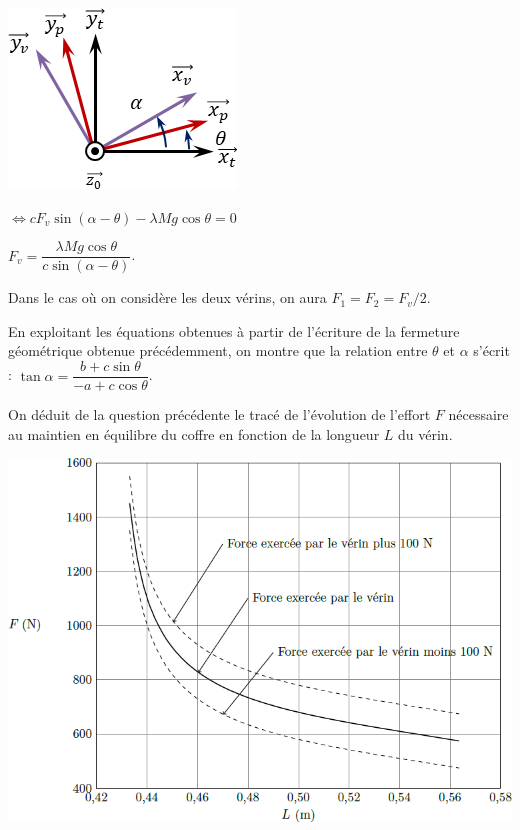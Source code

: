 \documentclass[10pt,fleqn]{article} %
\begin{document}
\begin{multicols}{2}
\begin{multicols}{2}
\begin{corrige}
\begin{center}
\includegraphics[width=.5\linewidth]{images/cor_03}

$\Leftrightarrow  c F_v\sin \left( \alpha - \theta\right) - \lambda Mg\cos \theta  = {0} $

$   F_v = \dfrac{\lambda Mg\cos \theta}{c\sin \left( \alpha - \theta\right)} $.

Dans le cas où on considère les deux vérins, on aura $F_1=F_2=F_v/2$.

\end{center}


\end{corrige}


\else
\fi

\ifprof
\else
En exploitant les équations obtenues à partir de l’écriture de la fermeture géométrique obtenue précédemment, on montre que la relation entre $\theta$ et $\alpha$ s’écrit : 
$ \tan \alpha = \dfrac{b+c\sin\theta}{-a+c\cos\theta}$.

On déduit de la question précédente le tracé de l’évolution de l’effort $F$ nécessaire au maintien en équilibre du coffre en fonction de la longueur $L$ du vérin.


\begin{center}
\includegraphics[width=.8\linewidth]{images/fig_03}
\end{center}


\end{multicols}
\end{multicols}
\end{document}
